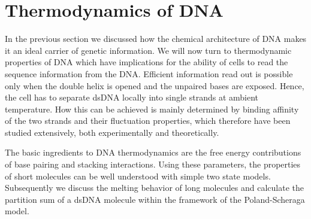 \section{Thermodynamics of DNA}
In the previous section we discussed how the chemical architecture of DNA makes it an
ideal carrier of genetic information. We will now turn to thermodynamic properties
of DNA which have implications for the ability of cells to read the sequence information from the DNA. 
Efficient information read out is possible only when the double helix is opened and the unpaired bases are exposed. Hence, the cell has to separate dsDNA locally into single strands at ambient temperature.
How this can be achieved is mainly determined by binding affinity of the two strands and their 
fluctuation properties, which therefore have been studied extensively, both
experimentally and theoretically. 

The basic ingredients to DNA thermodynamics are the free energy contributions of base pairing
and stacking interactions. Using these parameters, the properties of short 
molecules can be well understood with simple two state models. 
Subsequently we discuss the melting behavior of long molecules and calculate the 
partition sum of a dsDNA molecule within the framework of the Poland-Scheraga model.

